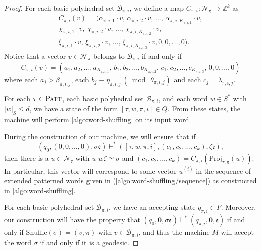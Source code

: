 \begin{proof}
For each basic polyhedral set $\mathcal{B}_{\pi,i}$, we define a map $C_{\pi,i} \colon \mathcal{N}_\pi \to \mathbb{Z}^k$ as
\begin{multline}\label{eq:configuration-of-counters}
	C_{\pi,i}(v) = (
		\alpha_{\pi,i,1} \cdot {v},\,
		\alpha_{\pi,i,2} \cdot {v},\,
		\ldots,\,
		\alpha_{\pi,i,K_{\pi,i,1}} \cdot {v},
	\\
		\chi_{\pi,i,1} \cdot {v},\,
		\chi_{\pi,i,2} \cdot {v},\,
		\ldots,\,
		\chi_{\pi,i,K_{\pi,i,2}} \cdot {v},\,
	\\
		\xi_{\pi,i,1} \cdot {v},\,
		\xi_{\pi,i,2} \cdot {v},\,
		\ldots,\,
		\xi_{\pi,i,K_{\pi,i,3}} \cdot {v},
		0,0,\ldots,0
	).
\end{multline}
Notice that a vector $v \in \mathcal{N}_{\pi}$ belongs to $\mathcal{B}_{\pi,i}$ if and only if
\[
	C_{\pi,i}(v)
	=
	(
		a_1, a_2,\ldots, a_{K_{\pi,i,1}},\,
		b_1, b_2,\ldots, b_{K_{\pi,i,2}},\,
		c_1, c_2,\ldots, c_{K_{\pi,i,3}},\,
		0,0,\ldots,0
	)
\]
where each $a_{j} > \beta_{\pi,i,j}$, each $b_j \equiv \eta_{\pi,i,j}\ (\bmod\ \theta_{\pi,i,j})$ and each $c_{j} = \lambda_{\pi,i,j}$.


For each $\tau \in \textsc{Patt}$, each basic polyhedral set $\mathcal{B}_{\pi,i}$, and each word $w \in S^*$ with $|w|_S \leqslant d$, we have a state of the form $[\tau,w,\pi,i] \in Q$.
From these states, the machine will perform \cref{algo:word-shuffling} on its input word.

During the construction of our machine, we will ensure that if
\[
	(q_0,(0,0,\ldots,0),\sigma\mathfrak{e})
	\vdash^*
	([\tau,w,\pi,i],(c_1,c_2,\ldots,c_k),\zeta\mathfrak{e}),
\]
then there is a $u \in \mathcal{N}_\tau$ with $u^\tau w \zeta \simeq \sigma$ and $(c_1,c_2,\ldots,c_k) = C_{\pi,i}(\mathrm{Proj}_{\tau,\pi}(u))$.
In particular, this vector will correspond to some vector $u^{(i)}$ in the sequence of extended patterned words given in (\ref{algo:word-shuffling/sequence}) as constructed in \cref{algo:word-shuffling}.

For each basic polyhedral set $\mathcal{B}_{\pi,i}$, we have an accepting state $q_{\pi,i} \in F$.
Moreover, our construction will have the property that $(q_0,\mathbf{0},\sigma\mathfrak{e})\vdash^*(q_{\pi,i},\mathbf{0},\mathfrak{e})$ if and only if $\mathrm{Shuffle}(\sigma) = (v,\pi)$ with $v \in \mathcal{B}_{\pi,i}$,
and thus the machine $M$ will accept the word $\sigma$ if and only if it is a geodesic.



\end{proof}
